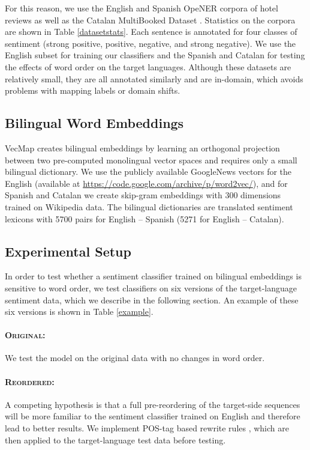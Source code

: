\documentclass[a4paper,11pt,twocolumn,twoside]{article}
\newcommand{\original}{\textsc{Original}\xspace}
\newcommand{\mtreordered}{\textsc{Reordered}\xspace}
\begin{document}
For this reason, we use the English and Spanish OpeNER corpora of hotel reviews \cite{Agerri2013} as well as the Catalan MultiBooked Dataset \cite{Barnes2018a}. Statistics on the corpora are shown in Table \ref{datasetstats}. Each sentence is annotated for four classes of sentiment (strong positive, positive, negative, and strong negative). We use the English subset for training our classifiers and the Spanish and Catalan for testing the effects of word order on the target languages. Although these datasets are relatively small, they are all annotated similarly and
are in-domain, which avoids problems with mapping labels or domain shifts.

\subsection{Bilingual Word Embeddings}

VecMap \cite{Artetxe2016,Artetxe2017} creates bilingual embeddings by learning an orthogonal projection between two pre-computed monolingual vector spaces and requires only a small bilingual dictionary. We use the publicly available GoogleNews vectors for the English (available at \url{https://code.google.com/archive/p/word2vec/}), and for Spanish and Catalan we create skip-gram embeddings with 300 dimensions trained on Wikipedia data. The bilingual dictionaries are translated sentiment lexicons \cite{HuandLiu2004} with 5700 pairs for English -- Spanish (5271 for English -- Catalan).


\subsection{Experimental Setup}


In order to test whether a sentiment classifier trained on bilingual embeddings is sensitive to word order, we test classifiers on six versions of the target-language sentiment data, which we describe in the following section. An example of these six versions is shown in Table \ref{example}.

\paragraph{\original: } We test the model on the original data with no changes in word order.

\paragraph{\mtreordered: }A competing hypothesis is that a full pre-reordering of the target-side sequences will be more familiar to the sentiment classifier trained on English and therefore lead to better results. We implement POS-tag based rewrite rules \cite{Crego2006,Crego2006b}, which are then applied to the target-language test data before testing.
\end{document}
